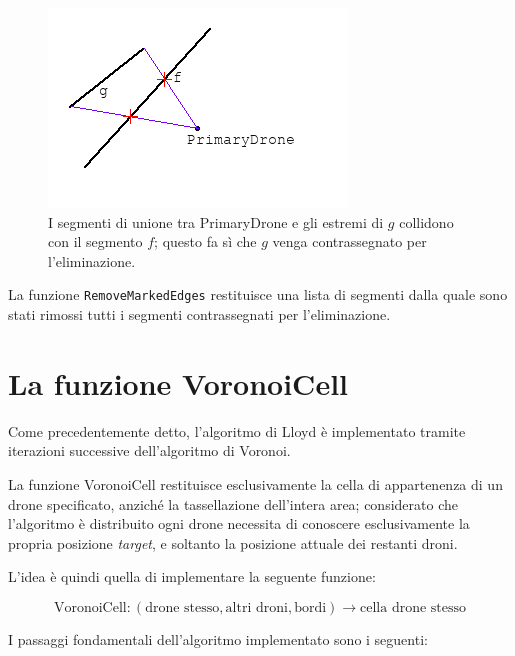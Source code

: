 \documentclass[11pt,a4paper]{report}
\newcommand{\modelicaclass}[1]{
	
}
\newcommand{\name}[1]{{\ttfamily #1}}
\begin{document}
\begin{figure}[H]
\centering
\includegraphics[scale=0.7]{rimozione_segmento2.png}
\caption{I segmenti di unione tra \name{PrimaryDrone} e gli estremi di $g$ collidono con il segmento $f$; questo fa sì che $g$ venga contrassegnato per l'eliminazione.}
\end{figure}

\modelicaclass{MarkUnwantedEdges.mo}

La funzione \verb|RemoveMarkedEdges| restituisce una lista di segmenti dalla quale sono stati rimossi tutti i segmenti contrassegnati per l'eliminazione.

\modelicaclass{RemoveMarkedEdges.mo}

\section{La funzione \name{VoronoiCell}}

Come precedentemente detto, l'algoritmo di Lloyd è implementato tramite iterazioni successive dell'algoritmo di Voronoi.

La funzione \name{VoronoiCell} restituisce esclusivamente la cella di appartenenza di un drone specificato, anziché la tassellazione dell'intera area; considerato che l'algoritmo è distribuito ogni drone necessita di conoscere esclusivamente la propria posizione \textit{target}, e soltanto la posizione attuale dei restanti droni.

L'idea è quindi quella di implementare la seguente funzione:

\[
\text{VoronoiCell} : (\text{drone stesso}, \text{altri droni}, \text{bordi}) \longrightarrow \text{cella drone stesso}
\]

I passaggi fondamentali dell'algoritmo implementato sono i seguenti:

\end{document}
